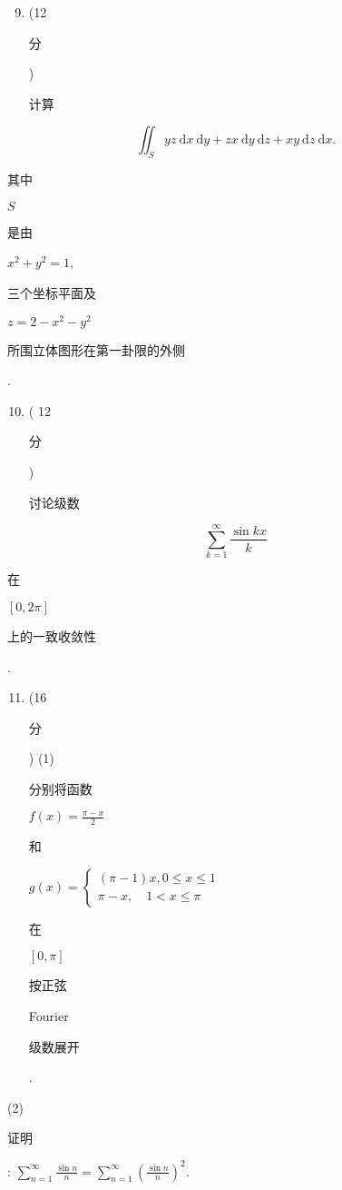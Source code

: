 \documentclass[10pt]{article}
\begin{document}
\begin{enumerate}
  \setcounter{enumi}{8}
  \item (12 \begin{CJK}{UTF8}{mj}分\end{CJK}) \begin{CJK}{UTF8}{mj}计算\end{CJK}
\end{enumerate}
$$
\iint_{S} y z \mathrm{~d} x \mathrm{~d} y+z x \mathrm{~d} y \mathrm{~d} z+x y \mathrm{~d} z \mathrm{~d} x .
$$
\begin{CJK}{UTF8}{mj}其中\end{CJK} $S$ \begin{CJK}{UTF8}{mj}是由\end{CJK} $x^{2}+y^{2}=1$,\begin{CJK}{UTF8}{mj}三个坐标平面及\end{CJK} $z=2-x^{2}-y^{2}$ \begin{CJK}{UTF8}{mj}所围立体图形在第一卦限的外侧\end{CJK}.

\begin{enumerate}
  \setcounter{enumi}{9}
  \item ( 12 \begin{CJK}{UTF8}{mj}分\end{CJK}) \begin{CJK}{UTF8}{mj}讨论级数\end{CJK}
\end{enumerate}
$$
\sum_{k=1}^{\infty} \frac{\sin k x}{k}
$$
\begin{CJK}{UTF8}{mj}在\end{CJK} $[0,2 \pi]$ \begin{CJK}{UTF8}{mj}上的一致收敛性\end{CJK}.

\begin{enumerate}
  \setcounter{enumi}{10}
  \item (16 \begin{CJK}{UTF8}{mj}分\end{CJK}) (1) \begin{CJK}{UTF8}{mj}分别将函数\end{CJK} $f(x)=\frac{\pi-x}{2}$ \begin{CJK}{UTF8}{mj}和\end{CJK} $g(x)=\left\{\begin{array}{l}(\pi-1) x, 0 \leq x \leq 1 \\ \pi-x, \quad 1<x \leq \pi\end{array}\right.$ \begin{CJK}{UTF8}{mj}在\end{CJK} $[0, \pi]$ \begin{CJK}{UTF8}{mj}按正弦\end{CJK} Fourier \begin{CJK}{UTF8}{mj}级数展开\end{CJK}.
\end{enumerate}
(2) \begin{CJK}{UTF8}{mj}证明\end{CJK}: $\sum_{n=1}^{\infty} \frac{\sin n}{n}=\sum_{n=1}^{\infty}\left(\frac{\sin n}{n}\right)^{2}$.
\end{document}
